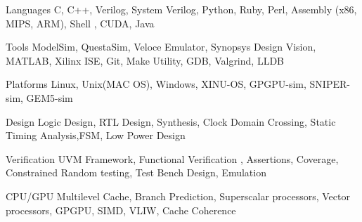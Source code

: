 

\begin{cvskills}

  \cvskill
    {Languages} %
    {\color{black}C, C++, Verilog, System Verilog, Python, Ruby, Perl, Assembly (x86, MIPS, ARM), Shell , CUDA, Java} %

  \cvskill
    {Tools} %
    {ModelSim, QuestaSim, Veloce Emulator, Synopsys Design Vision, MATLAB, Xilinx ISE, Git, Make Utility, GDB, Valgrind, LLDB} %

    \cvskill
    {Platforms} %
    {Linux, Unix(MAC OS), Windows, XINU-OS, GPGPU-sim, SNIPER-sim, GEM5-sim} %

  \cvskill
    {Design} %
    { Logic Design, RTL Design, Synthesis, Clock Domain Crossing, Static Timing Analysis,FSM, Low Power Design} %

  \cvskill
    {Verification} %
    {UVM Framework, Functional Verification , Assertions, Coverage, Constrained Random testing, Test Bench Design, Emulation} %

  \cvskill
    {CPU/GPU} %
    {Multilevel Cache, Branch Prediction, Superscalar processors, Vector processors, GPGPU, SIMD, VLIW, Cache Coherence} %

  

\end{cvskills}
